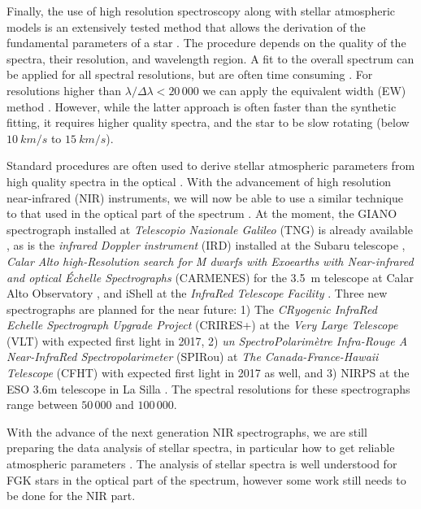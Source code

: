 \documentclass{aa}
\begin{document}
Finally, the use of high resolution spectroscopy along with stellar atmospheric
models is an extensively tested method that allows the derivation of the
fundamental parameters of a star \citep[see e.g.][]{Valenti2005,Santos13}. The
procedure depends on the quality of the spectra, their resolution, and
wavelength region. A fit to the overall spectrum can be applied for all spectral
resolutions, but are often time consuming \citep[see e.g.][]{Recio2006,Tsantaki2014}.
For resolutions higher than $\lambda/\Delta\lambda < 20\,000$ we can apply the
equivalent width (EW) method \citep[see e.g.][for details]{Tsantaki2013,Andreasen2017a}.
However, while the latter approach is often faster than the synthetic fitting,
it requires higher quality spectra, and the star to be slow rotating (below
$\SI{10}{km/s}$ to $\SI{15}{km/s}$).

Standard procedures are often used to derive stellar atmospheric parameters from
high quality spectra in the optical \citep[see e.g.][]{Valenti2005,Sousa2008a}.
With the advancement of high resolution near-infrared (NIR) instruments, we will
now be able to use a similar technique to that used in the optical part of the
spectrum \citep[see e.g.][]{Melendez1999,Sousa2008a,Tsantaki2013,Mucciarelli2013,Bensby2014}.
At the moment, the GIANO spectrograph installed at \emph{Telescopio Nazionale
Galileo} (TNG) is already available \citep{GIANO}, as is the \emph{infrared
Doppler instrument} (IRD) installed at the Subaru telescope \citep{IRD},
\emph{Calar Alto high-Resolution search for M dwarfs with Exoearths with
Near-infrared and optical Échelle Spectrographs} (CARMENES) for the \SI{3.5}{m}
telescope at Calar Alto Observatory \citep{CARMENES}, and iShell at the
\emph{InfraRed Telescope Facility} \citep{ishell1,ishell2}. Three new
spectrographs are planned for the near future: 1) The \emph{CRyogenic InfraRed
Echelle Spectrograph Upgrade Project} (CRIRES+) at the \emph{Very Large
Telescope} (VLT) \citep{CRIRESp} with expected first light in 2017, 2) \emph{un
SpectroPolarimètre Infra-Rouge A Near-InfraRed Spectropolarimeter} (SPIRou) at
\emph{The Canada-France-Hawaii Telescope} (CFHT) \citep{SPIROU1,SPIROU2} with
expected first light in 2017 as well, and 3) NIRPS at the ESO 3.6m telescope in
La Silla \citep{NIRPS}. The spectral resolutions for these spectrographs range
between $50\,000$ and $100\,000$.

With the advance of the next generation NIR spectrographs, we are still
preparing the data analysis of stellar spectra, in particular how to get
reliable atmospheric parameters \citep[see e.g.][]{Onehag2012,Lindgren2016,Andreasen2016}.
The analysis of stellar spectra is well understood for FGK stars in the optical
part of the spectrum, however some work still needs to be done for the NIR part.
\end{document}
